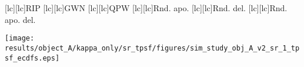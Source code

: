 [lc][lc]{\footnotesize \acs{RIP}}
[lc][lc]{\footnotesize \acs{GWN}}
[lc][lc]{\footnotesize \acs{QPW}}
[lc][lc]{\footnotesize Rnd. apo.}
[lc][lc]{\footnotesize Rnd. del.}
[lc][lc]{\footnotesize Rnd. apo. del.}

\texttt{[image: results/object\_A/kappa\_only/sr\_tpsf/figures/sim\_study\_obj\_A\_v2\_sr\_1\_tpsf\_ecdfs.eps]}
